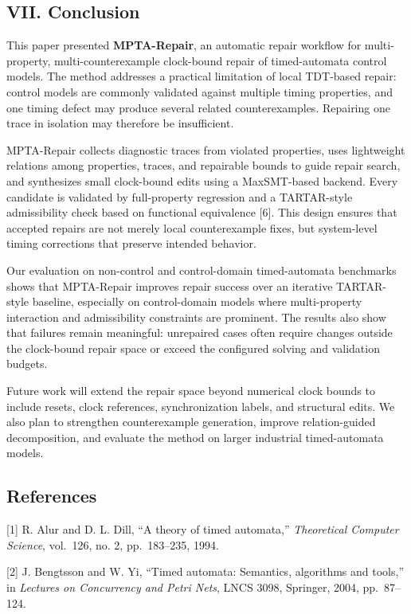 \documentclass[
]{article}
\begin{document}
\subsection{VII. Conclusion}\label{vii.-conclusion}

This paper presented \textbf{MPTA-Repair}, an automatic repair workflow
for multi-property, multi-counterexample clock-bound repair of
timed-automata control models. The method addresses a practical
limitation of local TDT-based repair: control models are commonly
validated against multiple timing properties, and one timing defect may
produce several related counterexamples. Repairing one trace in
isolation may therefore be insufficient.

MPTA-Repair collects diagnostic traces from violated properties, uses
lightweight relations among properties, traces, and repairable bounds to
guide repair search, and synthesizes small clock-bound edits using a
MaxSMT-based backend. Every candidate is validated by full-property
regression and a TARTAR-style admissibility check based on functional
equivalence {[}6{]}. This design ensures that accepted repairs are not
merely local counterexample fixes, but system-level timing corrections
that preserve intended behavior.

Our evaluation on non-control and control-domain timed-automata
benchmarks shows that MPTA-Repair improves repair success over an
iterative TARTAR-style baseline, especially on control-domain models
where multi-property interaction and admissibility constraints are
prominent. The results also show that failures remain meaningful:
unrepaired cases often require changes outside the clock-bound repair
space or exceed the configured solving and validation budgets.

Future work will extend the repair space beyond numerical clock bounds
to include resets, clock references, synchronization labels, and
structural edits. We also plan to strengthen counterexample generation,
improve relation-guided decomposition, and evaluate the method on larger
industrial timed-automata models.

\subsection{References}\label{references}

{[}1{]} R. Alur and D. L. Dill, ``A theory of timed automata,''
\emph{Theoretical Computer Science}, vol.~126, no. 2, pp.~183--235,
1994.

{[}2{]} J. Bengtsson and W. Yi, ``Timed automata: Semantics, algorithms
and tools,'' in \emph{Lectures on Concurrency and Petri Nets}, LNCS
3098, Springer, 2004, pp.~87--124.
\end{document}
